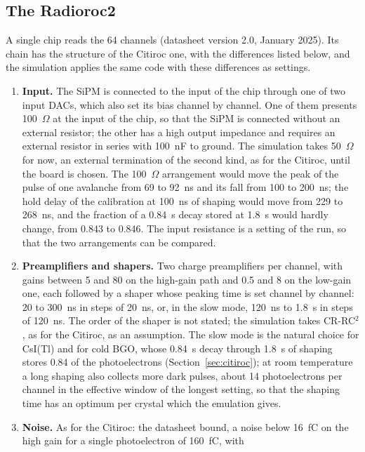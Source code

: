 \documentclass[11pt]{article}
\newcommand{\us}{\textmu s\xspace}
\newcommand{\csitl}{CsI(Tl)\xspace}
\begin{document}
\subsection{The Radioroc2}
\label{sec:radioroc}

A single chip reads the 64 channels (datasheet version 2.0, January 2025).
Its chain has the structure of the Citiroc one, with the differences
listed below, and the simulation applies the same code with these
differences as settings.

\begin{enumerate}
\item {\bf Input.} The SiPM is connected to the input of the chip through
  one of two input DACs, which also set its bias channel by channel. One
  of them presents 100~$\Omega$ at the input of the chip, so that the SiPM
  is connected without an external resistor; the other has a high output
  impedance and requires an external resistor in series with 100~nF to
  ground. The simulation takes 50~$\Omega$ for now, an external
  termination of the second kind, as for the Citiroc, until the board is
  chosen. The 100~$\Omega$ arrangement would move the peak of the pulse of
  one avalanche from 69 to 92~ns and its fall from 100 to 200~ns; the hold
  delay of the calibration at 100~ns of shaping would move from 229 to
  268~ns, and the fraction of a 0.84~\us decay stored at 1.8~\us would
  hardly change, from 0.843 to 0.846. The input resistance is a setting of
  the run, so that the two arrangements can be compared.
\item {\bf Preamplifiers and shapers.} Two charge preamplifiers per channel,
  with gains between 5 and 80 on the high-gain path and 0.5 and 8 on the
  low-gain one, each followed by a shaper whose peaking time is set channel
  by channel: 20 to 300~ns in steps of 20~ns, or, in the slow mode, 120~ns
  to 1.8~\us in steps of 120~ns. The order of the shaper is not stated; the
  simulation takes CR-RC$^2$, as for the Citiroc, as an assumption. The slow mode is the natural choice for \csitl and
  for cold BGO, whose 0.84~\us decay through 1.8~\us of shaping stores 0.84
  of the photoelectrons (Section~\ref{sec:citiroc}); at room temperature
  a long shaping also collects more dark pulses, about 14 photoelectrons
  per channel in the effective window of the longest setting, so that the
  shaping time has an optimum per crystal which the emulation gives.
\item {\bf Noise.} As for the Citiroc: the datasheet bound, a noise below
  16~fC on the high gain for a single photoelectron of 160~fC, with

\end{enumerate}
\end{document}
